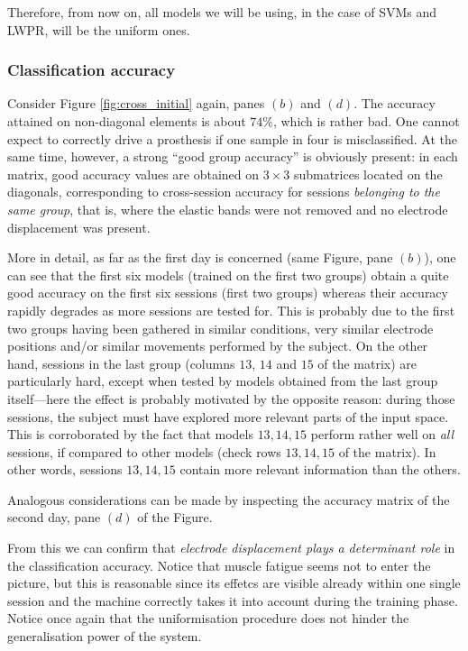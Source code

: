 Therefore, from now on, all models we will be using, in the case of
SVMs and LWPR, will be the uniform ones.

\subsubsection{Classification accuracy}

Consider Figure \ref{fig:cross_initial} again, panes $(b)$ and
$(d)$. The accuracy attained on non-diagonal elements is about
$74\%$, which is rather bad. One cannot expect to correctly drive
a prosthesis if one sample in four is misclassified. At the same
time, however, a strong ``good group accuracy'' is obviously
present: in each matrix, good accuracy values are obtained on
$3\times3$ submatrices located on the diagonals, corresponding to
cross-session accuracy for sessions \emph{belonging to the same
group}, that is, where the elastic bands were not removed and no
electrode displacement was present.

More in detail, as far as the first day is concerned (same Figure,
pane $(b)$), one can see that the first six models (trained on the
first two groups) obtain a quite good accuracy on the first six
sessions (first two groups) whereas their accuracy rapidly
degrades as more sessions are tested for. This is probably due to
the first two groups having been gathered in similar conditions,
very similar electrode positions and/or similar movements
performed by the subject. On the other hand, sessions in the last
group (columns $13$, $14$ and $15$ of the matrix) are particularly
hard, except when tested by models obtained from the last group
itself---here the effect is probably motivated by the opposite
reason: during those sessions, the subject must have explored more
relevant parts of the input space. This is corroborated by the
fact that models $13,14,15$ perform rather well on \emph{all}
sessions, if compared to other models (check rows $13,14,15$ of
the matrix). In other words, sessions $13,14,15$ contain more
relevant information than the others.

Analogous considerations can be made by inspecting the accuracy matrix
of the second day, pane $(d)$ of the Figure.

From this we can confirm that \emph{electrode displacement plays a
determinant role} in the classification accuracy. Notice that
muscle fatigue seems not to enter the picture, but this is
reasonable since its effetcs are visible already within one single
session and the machine correctly takes it into account during the
training phase. Notice once again that the uniformisation
procedure does not hinder the generalisation power of the system.

